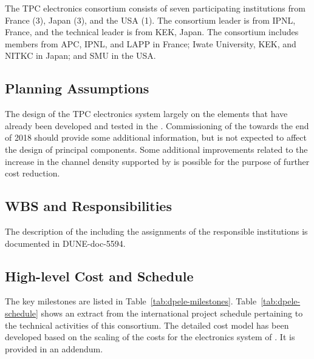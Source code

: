 The \dual TPC electronics consortium %
consists of seven participating institutions from France (\num{3}), Japan (\num{3}), and the USA (\num{1}). The consortium leader is %
from IPNL, France, and the technical leader is %
from KEK, Japan. The consortium includes members from APC, IPNL, and LAPP in France; Iwate University, KEK, and NITKC in Japan; and SMU in the USA.



\subsection{Planning Assumptions}
\label{sec:fddp-tpc-elec-org-assmp}
The %
design of the \dual TPC electronics system %
largely on the elements that have already been developed and tested in the . Commissioning of the  towards the end of 2018 should provide some additional information, but is not expected to affect the design of principal components. Some additional improvements related to the increase in the channel density supported by   %
is possible for the purpose of further cost reduction. 

\subsection{WBS and Responsibilities}
\label{sec:fddp-tpc-elec-org-wbs}

The description of the  including the assignments of the responsible institutions is documented in DUNE-doc-5594. 

\subsection{High-level Cost and Schedule}
\label{sec:fddp-tpc-elec-org-cs}

The key milestones are listed in Table~\ref{tab:dpele-milestones}. 
Table~\ref{tab:dpele-schedule} shows an extract from the international project schedule pertaining to the technical activities of this consortium. The detailed cost model has been developed based on the scaling of the costs for the electronics system of . It is provided in an addendum. 

